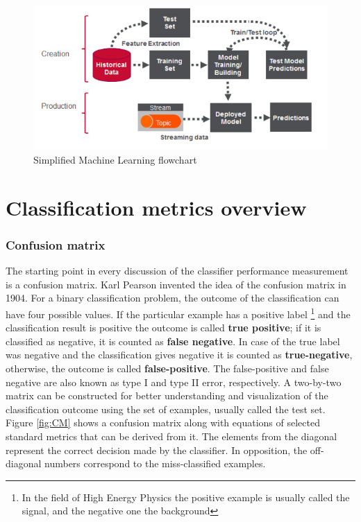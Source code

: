 \begin{figure}
\centering
\includegraphics{figures/MLflowchart.jpg}
\caption{Simplified Machine Learning flowchart
\label{fig:ML_flow}}
\end{figure}


\section{Classification metrics overview}
\subsubsection{Confusion matrix}
The starting point in every discussion of the classifier performance measurement is a confusion matrix. Karl Pearson invented the idea of the confusion matrix in 1904. For a binary classification problem, the outcome of the classification can have four possible values. If the particular example has a positive label \footnote{In the field of High Energy Physics the positive example is usually called the signal, and the negative one the background} and the classification result is positive the outcome is called \textbf{true positive}; if it is classified as negative, it is counted as \textbf{false negative}. In case of the true label was negative and the classification gives negative it is counted as \textbf{true-negative}, otherwise, the outcome is called \textbf{false-positive}. The false-positive and false negative are also known as type I and type II error, respectively. 
A two-by-two matrix can be constructed for better understanding and visualization of the classification outcome using the set of examples, usually called the test set. Figure \ref{fig:CM} shows a confusion matrix along with equations of selected standard metrics that can be derived from it. The elements from the diagonal represent the correct decision made by the classifier. In opposition, the off-diagonal numbers correspond to the miss-classified examples. 

